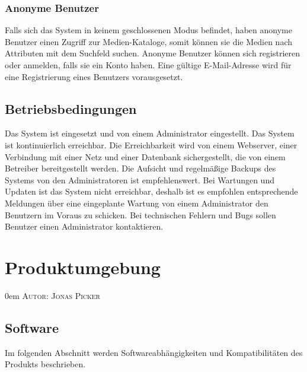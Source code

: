 \documentclass{article}
\makeatletter
\newcommand{\sectionauthor}[1]{
	{\parindent 0em \large \scshape Autor: #1 \par \nobreak \vspace*{2em}}
	\@afterheading
}
\makeatother
\begin{document}
\subsubsection{Anonyme Benutzer}
Falls sich das System in keinem geschlossenen Modus befindet, haben anonyme Benutzer einen Zugriff zur Medien-Kataloge, somit können sie die Medien nach Attributen mit dem Suchfeld suchen. Anonyme Benutzer können sich registrieren oder anmelden, falls sie ein Konto haben. Eine gültige E-Mail-Adresse wird für eine Registrierung eines Benutzers vorausgesetzt. 
\subsection{Betriebsbedingungen}
Das System ist eingesetzt und von einem Administrator eingestellt. Das System ist kontinuierlich erreichbar. Die Erreichbarkeit wird von einem Webserver, einer Verbindung mit einer Netz und einer Datenbank sichergestellt, die von einem Betreiber bereitgestellt werden. Die Aufsicht und regelmäßige Backups des Systems von den Administratoren ist empfehlenswert. Bei Wartungen und Updaten ist das System nicht erreichbar, deshalb ist es empfohlen entsprechende Meldungen über eine eingeplante Wartung von einem Administrator den Benutzern im Voraus zu schicken. Bei technischen Fehlern und Bugs sollen Benutzer einen Administrator kontaktieren.
\newpage

\section{Produktumgebung} %
\sectionauthor{Jonas Picker}

\subsection{Software}

Im folgenden Abschnitt werden Softwareabhängigkeiten und Kompatibilitäten des Produkts beschrieben.
\end{document}
